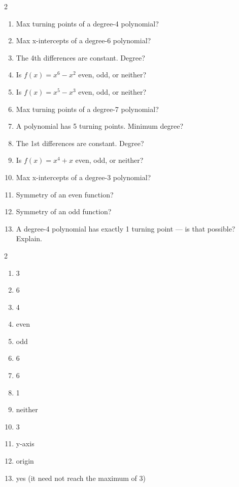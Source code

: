 \documentclass[11pt]{article}
\begin{document}
\clearpage
{}

\begin{recapbox}
\begin{multicols}{2}
\small
\begin{enumerate}[leftmargin=*,itemsep=3pt]
  \item Max turning points of a degree-4 polynomial?
  \item Max x-intercepts of a degree-6 polynomial?
  \item The 4th differences are constant. Degree?
  \item Is $f(x)=x^6-x^2$ even, odd, or neither?
  \item Is $f(x)=x^5-x^3$ even, odd, or neither?
  \item Max turning points of a degree-7 polynomial?
  \item A polynomial has 5 turning points. Minimum degree?
  \item The 1st differences are constant. Degree?
  \item Is $f(x)=x^4+x$ even, odd, or neither?
  \item Max x-intercepts of a degree-3 polynomial?
  \item Symmetry of an even function?
  \item Symmetry of an odd function?
  \item A degree-4 polynomial has exactly 1 turning point — is that possible? Explain.
\end{enumerate}
\end{multicols}
\end{recapbox}

\begin{keybox}
\begin{multicols}{2}
\small
\begin{enumerate}[leftmargin=*,itemsep=3pt]
  \item 3
  \item 6
  \item 4
  \item even
  \item odd
  \item 6
  \item 6
  \item 1
  \item neither
  \item 3
  \item y-axis
  \item origin
  \item yes (it need not reach the maximum of 3)
\end{enumerate}
\end{multicols}
\end{keybox}
\end{document}
